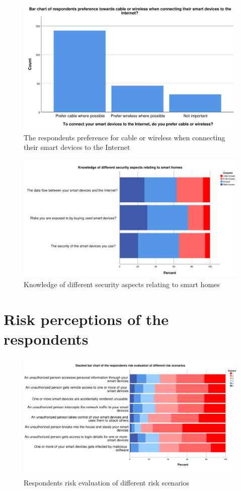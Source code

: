 \begin{figure}[H]
    \centering
    \includegraphics[scale=0.55]{figures/diagrams/connect_internet.pdf}
    \caption{The respondents preference for cable or wireless when connecting their smart devices to the Internet}
    \label{fig:connect_internet}
\end{figure}

\begin{figure}[H]
    \centering
    \includegraphics[scale=0.45]{figures/diagrams/knowledge_security.pdf}
    \caption{Knowledge of different security aspects relating to smart homes}
    \label{fig:knowledge_security}
\end{figure}

\section{Risk perceptions of the respondents}

\begin{figure}[H]
    \centering
    \includegraphics[scale=0.4]{figures/diagrams/risk_perception.pdf}
    \caption{Respondents risk evaluation of different risk scenarios}
    \label{fig:risk perception}
\end{figure}